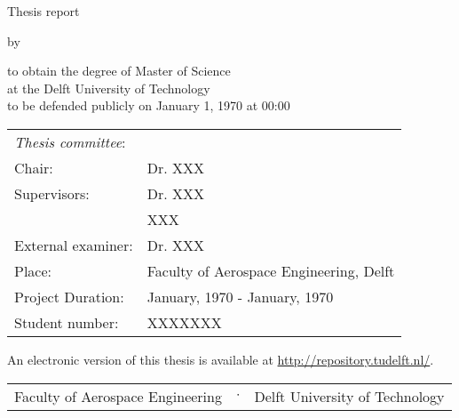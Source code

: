 \begin{titlepage}

\begin{center}

{\makeatletter
\largetitlestyle\fontsize{45}{45}\selectfont\@title
\makeatother}

\bigskip

{\makeatletter
\vspace{12mm}
\ifdefvoid{\@subtitle}{}{\largetitlestyle\fontsize{20}{20}\selectfont\@subtitle}
\makeatother}

\bigskip
\bigskip

Thesis report

\bigskip
\bigskip

by

\bigskip
\bigskip

{\makeatletter
\largetitlestyle\fontsize{25}{25}\selectfont\@author
\makeatother}

\bigskip
\bigskip

to obtain the degree of Master of Science \\
at the Delft University of Technology \\
to be defended publicly on January 1, 1970 at 00:00

\vfill

\begin{tabular}{ll}
\textit{Thesis committee}:      & \\
Chair:                          & Dr. XXX \\ 
Supervisors:                    & Dr. XXX \\
                                & XXX \\
External examiner:              & Dr. XXX \\ 
Place:                          & Faculty of Aerospace Engineering, Delft \\
Project Duration: & January, 1970 - January, 1970 \\
Student number: & XXXXXXX
\end{tabular}

\vspace*{1cm}

An electronic version of this thesis is available at \url{http://repository.tudelft.nl/}.

\vspace*{2cm}
  \begin{center}
    \begin{tabular}{lcr}
      Faculty of Aerospace Engineering & $\cdot$ & Delft University of Technology
    \end{tabular}
  \end{center}

\end{center}

\end{titlepage}
